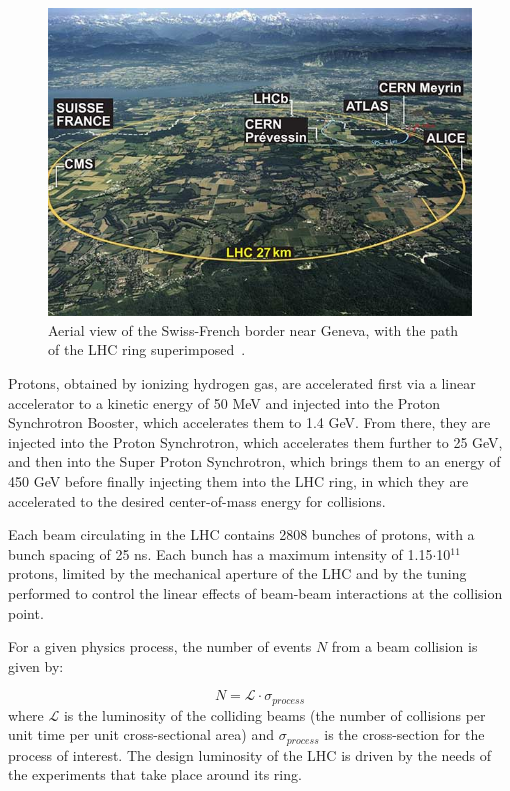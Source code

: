 \begin{figure}[hbtp]
  \begin{center}
    \includegraphics[width=2.0\cmsFigWidth]{figures/lhcring}
    \caption{Aerial view of the Swiss-French border near Geneva, with the path of the LHC ring superimposed~\cite{LHCring}.}
    \label{fig:lhc}
  \end{center}
\end{figure}

Protons, obtained by ionizing hydrogen gas, are accelerated first via a linear accelerator to a kinetic energy of 50 MeV and injected into the Proton Synchrotron Booster, which accelerates them to 1.4 GeV. From there, they are injected into the Proton Synchrotron, which accelerates them further to 25 GeV, and then into the Super Proton Synchrotron, which brings them to an energy of 450 GeV before finally injecting them into the LHC ring, in which they are accelerated to the desired center-of-mass energy for collisions.

Each beam circulating in the LHC contains 2808 bunches of protons, with a bunch spacing of 25 ns. Each bunch has a maximum intensity of 1.15$\cdot$10$^{11}$ protons, limited by the mechanical aperture of the LHC and by the tuning performed to control the linear effects of beam-beam interactions at the collision point.

For a given physics process, the number of events $N$ from a beam collision is given by:

\begin{equation}
N = \mathcal{L}\cdot\sigma_{process}
\label{eq:luminosityxsec}
\end{equation}
where $\mathcal{L}$ is the luminosity of the colliding beams (the number of collisions per unit time per unit cross-sectional area) and $\sigma_{process}$ is the cross-section for the process of interest. The design luminosity of the LHC is driven by the needs of the experiments that take place around its ring.

